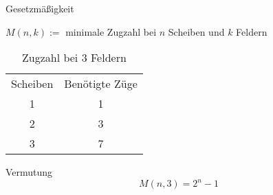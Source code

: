 \begin{frame}{Gesetzmäßigkeit}
    \begin{definition}
    $M(n,k) := $ minimale Zugzahl bei $n$ Scheiben und $k$ Feldern
    \end{definition}
    \begin{table}[h]
        \centering
        \begin{tabular}{c|c}
            Scheiben & Benötigte Züge \\
            1 & 1 \\
            2 & 3 \\
            3 & 7 \\
        \end{tabular}
        \caption{Zugzahl bei 3 Feldern}
        \label{tab:3f}
    \end{table}
    \begin{alertblock}{Vermutung}
    \[M(n,3) = 2^n-1\]
    \end{alertblock}
\end{frame}